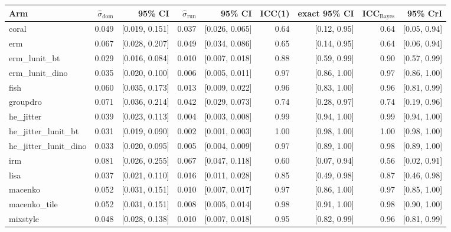 \begin{tabular}{lrrrrrrrr}
\toprule
Arm & $\hat\sigma_\text{dom}$ & 95\% CI & $\hat\sigma_\text{run}$ & 95\% CI & ICC(1) & exact 95\% CI & ICC$_\text{Bayes}$ & 95\% CrI \\
\midrule
coral & 0.049 & [0.019, 0.151] & 0.037 & [0.026, 0.065] & 0.64 & [0.12, 0.95] & 0.64 & [0.05, 0.94] \\
erm & 0.067 & [0.028, 0.207] & 0.049 & [0.034, 0.086] & 0.65 & [0.14, 0.95] & 0.64 & [0.06, 0.94] \\
erm\_lunit\_bt & 0.029 & [0.016, 0.084] & 0.010 & [0.007, 0.018] & 0.88 & [0.59, 0.99] & 0.90 & [0.57, 0.99] \\
erm\_lunit\_dino & 0.035 & [0.020, 0.100] & 0.006 & [0.005, 0.011] & 0.97 & [0.86, 1.00] & 0.97 & [0.86, 1.00] \\
fish & 0.060 & [0.035, 0.173] & 0.013 & [0.009, 0.022] & 0.96 & [0.83, 1.00] & 0.96 & [0.81, 0.99] \\
groupdro & 0.071 & [0.036, 0.214] & 0.042 & [0.029, 0.073] & 0.74 & [0.28, 0.97] & 0.74 & [0.19, 0.96] \\
he\_jitter & 0.039 & [0.023, 0.113] & 0.004 & [0.003, 0.008] & 0.99 & [0.94, 1.00] & 0.99 & [0.94, 1.00] \\
he\_jitter\_lunit\_bt & 0.031 & [0.019, 0.090] & 0.002 & [0.001, 0.003] & 1.00 & [0.98, 1.00] & 1.00 & [0.98, 1.00] \\
he\_jitter\_lunit\_dino & 0.033 & [0.020, 0.095] & 0.005 & [0.004, 0.009] & 0.97 & [0.89, 1.00] & 0.98 & [0.89, 1.00] \\
irm & 0.081 & [0.026, 0.255] & 0.067 & [0.047, 0.118] & 0.60 & [0.07, 0.94] & 0.56 & [0.02, 0.91] \\
lisa & 0.037 & [0.021, 0.110] & 0.016 & [0.011, 0.028] & 0.85 & [0.49, 0.98] & 0.87 & [0.46, 0.98] \\
macenko & 0.052 & [0.031, 0.151] & 0.010 & [0.007, 0.017] & 0.97 & [0.86, 1.00] & 0.97 & [0.85, 1.00] \\
macenko\_tile & 0.052 & [0.031, 0.151] & 0.008 & [0.005, 0.014] & 0.98 & [0.91, 1.00] & 0.98 & [0.90, 1.00] \\
mixstyle & 0.048 & [0.028, 0.138] & 0.010 & [0.007, 0.018] & 0.95 & [0.82, 0.99] & 0.96 & [0.81, 0.99] \\

\end{tabular}
